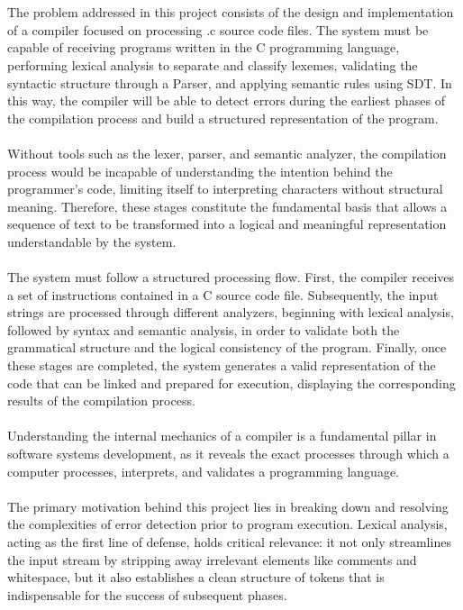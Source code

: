 \documentclass[letterpaper,12pt,oneside]{article}
\begin{document}
    \\ \\ 
    The problem addressed in this project consists of the design and implementation of a compiler focused on processing .c source code files. The system must be capable of receiving programs written in the C programming language, performing lexical analysis to separate and classify lexemes, validating the syntactic structure through a Parser, and applying semantic rules using SDT. In this way, the compiler will be able to detect errors during the earliest phases of the compilation process and build a structured representation of the program.
    \\ \\
    Without tools such as the lexer, parser, and semantic analyzer, the compilation process would be incapable of understanding the intention behind the programmer’s code, limiting itself to interpreting characters without structural meaning. Therefore, these stages constitute the fundamental basis that allows a sequence of text to be transformed into a logical and meaningful representation understandable by the system.
    \\ \\
    The system must follow a structured processing flow. First, the compiler receives a set of instructions contained in a C source code file. Subsequently, the input strings are processed through different analyzers, beginning with lexical analysis, followed by syntax and semantic analysis, in order to validate both the grammatical structure and the logical consistency of the program. Finally, once these stages are completed, the system generates a valid representation of the code that can be linked and prepared for execution, displaying the corresponding results of the compilation process.
    \\ \\
    Understanding the internal mechanics of a compiler is a fundamental pillar in software systems development, as it reveals the exact processes through which a computer processes, interprets, and validates a programming language.
    \\ \\
    The primary motivation behind this project lies in breaking down and resolving the complexities of error detection prior to program execution. Lexical analysis, acting as the first line of defense, holds critical relevance: it not only streamlines the input stream by stripping away irrelevant elements like comments and whitespace, but it also establishes a clean structure of tokens that is indispensable for the success of subsequent phases.
\end{document}
